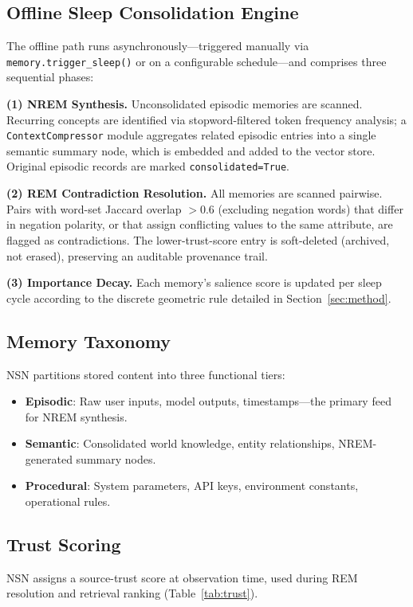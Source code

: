 \documentclass[conference]{IEEEtran}
\begin{document}
\subsection{Offline Sleep Consolidation Engine}
The offline path runs asynchronously---triggered manually via
\texttt{memory.trigger\_sleep()} or on a configurable schedule---and
comprises three sequential phases:

\textbf{(1) NREM Synthesis.}
Unconsolidated episodic memories are scanned.  Recurring concepts are
identified via stopword-filtered token frequency analysis; a
\texttt{ContextCompressor} module aggregates related episodic entries into a
single semantic summary node, which is embedded and added to the vector store.
Original episodic records are marked \texttt{consolidated=True}.

\textbf{(2) REM Contradiction Resolution.}
All memories are scanned pairwise.  Pairs with word-set Jaccard overlap
$>0.6$ (excluding negation words) that differ in negation polarity, or that
assign conflicting values to the same attribute, are flagged as contradictions.
The lower-trust-score entry is soft-deleted (archived, not erased), preserving
an auditable provenance trail.

\textbf{(3) Importance Decay.}
Each memory's salience score is updated per sleep cycle according to the
discrete geometric rule detailed in Section~\ref{sec:method}.

\subsection{Memory Taxonomy}
NSN partitions stored content into three functional tiers:

\begin{itemize}
  \item \textbf{Episodic}: Raw user inputs, model outputs, timestamps---the
        primary feed for NREM synthesis.
  \item \textbf{Semantic}: Consolidated world knowledge, entity relationships,
        NREM-generated summary nodes.
  \item \textbf{Procedural}: System parameters, API keys, environment
        constants, operational rules.
\end{itemize}

\subsection{Trust Scoring}
NSN assigns a source-trust score at observation time, used during REM
resolution and retrieval ranking (Table~\ref{tab:trust}).
\end{document}
